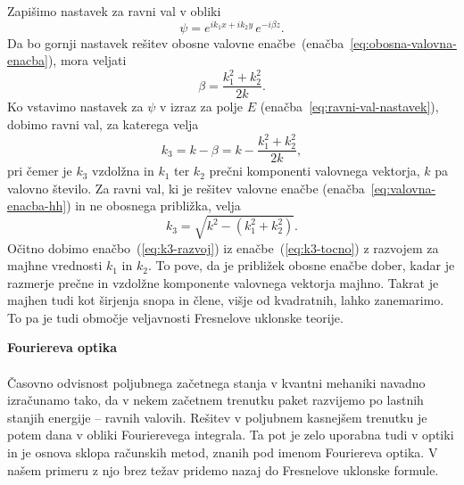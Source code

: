 Zapišimo nastavek za ravni val  v obliki
\begin{equation}
\psi=e^{ik_{1}x+ik_{2}y}\, e^{-i\beta z}.
\label{eq:ravni-val-nastavek-obosni}
\end{equation}
Da bo gornji nastavek rešitev
obosne valovne enačbe~(enačba~\ref{eq:obosna-valovna-enacba}), mora veljati 
\begin{equation}
\beta=\frac{k_{1}^{2}+k_{2}^{2}}{2k}.
\end{equation}
Ko vstavimo nastavek za $\psi$ v izraz za polje $E$ 
(enačba~\ref{eq:ravni-val-nastavek}), dobimo ravni val, za katerega velja 
\begin{equation}
k_{3}=k-\beta=k-\frac{k_{1}^{2}+k_{2}^{2}}{2k},\label{eq:k3-razvoj}
\end{equation}
 pri čemer je $k_{3}$ vzdolžna in $k_{1}$ ter
$k_{2}$ prečni komponenti valovnega vektorja, $k$ pa valovno število. 
Za ravni val, ki je rešitev valovne enačbe (enačba~\ref{eq:valovna-enacba-hh})
in ne obosnega približka, velja 
\begin{equation}
k_{3}=\sqrt{k^{2}-(k_{1}^{2}+k_{2}^{2})}.\label{eq:k3-tocno}
\end{equation}
Očitno dobimo enačbo~(\ref{eq:k3-razvoj}) iz enačbe~(\ref{eq:k3-tocno})
z razvojem za majhne vrednosti $k_1$ in $k_2$. To pove, da je približek obosne 
enačbe dober, kadar je razmerje prečne in vzdolžne komponente valovnega vektorja 
majhno. Takrat je majhen tudi kot širjenja snopa in člene, višje od kvadratnih,
lahko zanemarimo. To pa je tudi območje veljavnosti Fresnelove uklonske
teorije.

\begin{remark}{{\bf Fouriereva optika}}\\ \\
Časovno odvisnost poljubnega začetnega
stanja v kvantni mehaniki navadno izračunamo tako, da v nekem začetnem
trenutku paket razvijemo po lastnih stanjih energije -- ravnih valovih.
Rešitev v poljubnem kasnejšem trenutku je potem dana v obliki Fourierevega
integrala. Ta pot je zelo uporabna tudi v optiki in je osnova sklopa
računskih metod, znanih pod imenom Fouriereva optika. V našem primeru
z njo brez težav pridemo nazaj do Fresnelove uklonske formule.
\end{remark}

